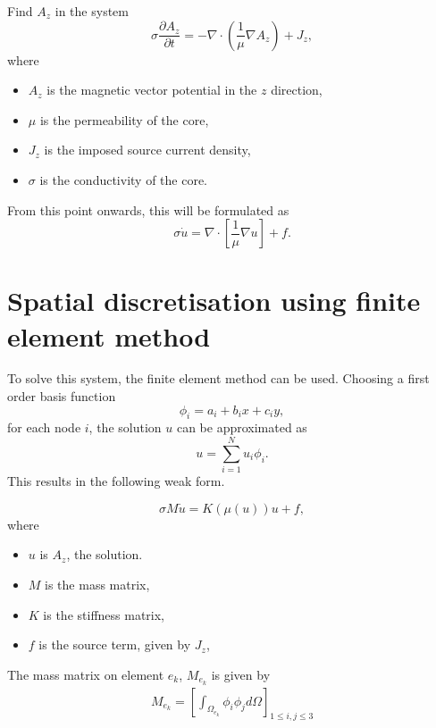 \begin{problem}
    Find $A_z$ in the system
    \begin{equation}
        \sigma\frac{\partial A_z}{\partial t} = - \nabla \cdot \left(\frac{1}{\mu} \nabla A_z \right) + J_z,
    \end{equation}
    where
    \begin{itemize}
        \item $A_z$ is the magnetic vector potential in the $z$ direction,
        \item $\mu$ is the permeability of the core,
        \item $J_z$ is the imposed source current density,
        \item $\sigma$ is the conductivity of the core.
    \end{itemize}
    From this point onwards, this will be formulated as
    \begin{equation}
        \sigma\dot u = \nabla \cdot \left[\frac{1}{\mu}\nabla u\right] + f.
    \end{equation}
\end{problem}

\newpage
\section{Spatial discretisation using finite element method}
To solve this system, the finite element method can be used. Choosing a first order basis function 
\[
    \phi_i = a_i + b_i x + c_i y,
\]
for each node $i$, the solution $u$ can be approximated as
\[
    u = \sum_{i=1}^N u_i \phi_i.
\]
This results in the following weak form.
\begin{weakform}
    \begin{equation}
        \sigma M \dot u = K(\mu(u)) u + f,
        \label{eqn:weakform}
    \end{equation}
    where
    \begin{itemize}
        \item $u$ is $A_z$, the solution.
        \item $M$ is the mass matrix,
        \item $K$ is the stiffness matrix,
        \item $f$ is the source term, given by $J_z$,
    \end{itemize}
\end{weakform}

\noindent The mass matrix on element $e_k$,  $M_{e_k}$ is given by
\begin{align*}
    M_{e_k} = \left[\int_{\Omega_{e_k}}\phi_i\phi_j d\Omega \right]_{1 \leq i, j \leq 3}
\end{align*}


